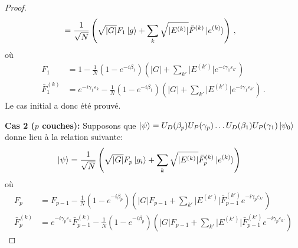 \begin{proof}
\begin{equation}
\begin{aligned}
    &= \frac{1}{\sqrt{ N }} \left( \sqrt{ \lvert G \rvert } F_{1} \ket{g} + \sum_{k} \sqrt{ \lvert E^{(k)} \rvert } \bar{F}^{(k)} \ket{e^{(k)}} \right) \,,
\end{aligned}
\end{equation}
où 
\begin{align}
    F_{1} &= 1 - \frac{1}{N} (1 - e^{-i\beta_{1}}) \left(  \lvert G \rvert + \sum_{k'} \lvert E^{(k')} \rvert e^{-i \gamma_{1} \varepsilon_{k'}} \right) \\
    \bar{F}^{(k)}_{1} &= e^{-i\gamma_{1} \varepsilon_{k}} - \frac{1}{N} (1 - e^{-i\beta_{1}}) \left(  \lvert G \rvert + \sum_{k'} \lvert E^{(k')} \rvert e^{-i \gamma_{1} \varepsilon_{k'}} \right) \,.
\end{align}
Le cas initial a donc été prouvé.

\textbf{Cas 2 ($p$ couches):}
Supposons que $\ket{\psi} = U_{D}(\beta_{p}) U_{P}(\gamma_{p}) \dots U_{D}(\beta_{1})U_{P}(\gamma_{1})\ket{\psi_{0}}$ donne lieu à la relation suivante:
\begin{equation}
\begin{aligned}
    \ket{\psi} &= \frac{1}{\sqrt{ N }} \left( \sqrt{ \lvert G \rvert } F_{p} \ket{g_{i}} + \sum_{k} \sqrt{ \lvert E^{(k)} \rvert } \bar{F}^{(k)}_{p} \ket{e^{(k)}} \right)
\end{aligned}
\end{equation}
où
\begin{equation}
\begin{aligned}
    F_{p} &= F_{p-1} - \frac{1}{N} (1-e^{-i\beta_{p}}) \left( \lvert G \rvert   F_{p-1} + \sum_{k'} \lvert E^{(k')} \rvert \bar{F}^{(k')}_{p-1} e^{-i\gamma_{p}\varepsilon_{k'}} \right) \\
    \bar{F}^{(k)}_{p} &= e^{-i\gamma_{p} \varepsilon_{k}}\bar{F}_{p-1}^{(k)} - \frac{1}{N} (1-e^{-i\beta_{p}}) \left( \lvert G \rvert   F_{p-1} + \sum_{k'} \lvert E^{(k')} \rvert \bar{F}^{(k')}_{p-1} e^{-i\gamma_{p}\varepsilon_{k'}} \right)
\end{aligned}
\end{equation}


\end{proof}
